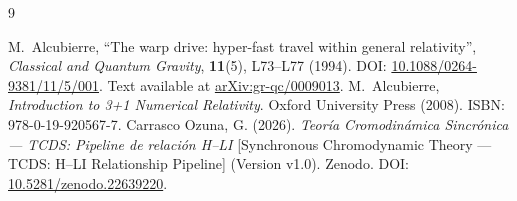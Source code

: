 \documentclass[10pt,a4paper,twocolumn]{article}
\begin{document}
\begin{thebibliography}{9}
    \small\raggedright
    M.~Alcubierre,
    ``The warp drive: hyper-fast travel within general relativity'',
    \textit{Classical and Quantum Gravity}, \textbf{11}(5), L73--L77 (1994).
    DOI: \href{https://doi.org/10.1088/0264-9381/11/5/001}{10.1088/0264-9381/11/5/001}.
    Text available at \href{https://arxiv.org/abs/gr-qc/0009013}{arXiv:gr-qc/0009013}.
    M.~Alcubierre,
    \textit{Introduction to 3+1 Numerical Relativity}.
    Oxford University Press (2008).
    ISBN: 978-0-19-920567-7.
    Carrasco Ozuna, G. (2026).
    \textit{Teoría Cromodinámica Sincrónica --- TCDS: Pipeline de relación H--LI}
    [Synchronous Chromodynamic Theory --- TCDS: H--LI Relationship Pipeline]
    (Version v1.0). Zenodo.
    DOI: \href{https://doi.org/10.5281/zenodo.22639220}{10.5281/zenodo.22639220}.
\end{thebibliography}
\end{document}
